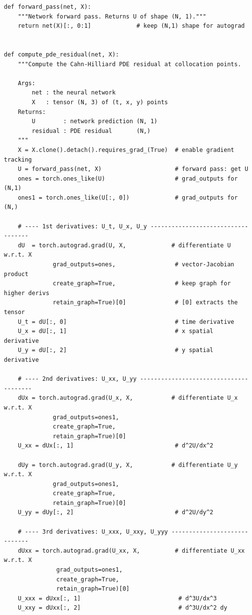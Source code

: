 \documentclass[11pt,a4paper]{article}
\begin{document}
\begin{lstlisting}
def forward_pass(net, X):
    """Network forward pass. Returns U of shape (N, 1)."""
    return net(X)[:, 0:1]             # keep (N,1) shape for autograd


def compute_pde_residual(net, X):
    """Compute the Cahn-Hilliard PDE residual at collocation points.

    Args:
        net : the neural network
        X   : tensor (N, 3) of (t, x, y) points
    Returns:
        U        : network prediction (N, 1)
        residual : PDE residual       (N,)
    """
    X = X.clone().detach().requires_grad_(True)  # enable gradient tracking
    U = forward_pass(net, X)                     # forward pass: get U
    ones = torch.ones_like(U)                    # grad_outputs for (N,1)
    ones1 = torch.ones_like(U[:, 0])             # grad_outputs for (N,)

    # ---- 1st derivatives: U_t, U_x, U_y -----------------------------------
    dU  = torch.autograd.grad(U, X,             # differentiate U w.r.t. X
              grad_outputs=ones,                 # vector-Jacobian product
              create_graph=True,                 # keep graph for higher derivs
              retain_graph=True)[0]              # [0] extracts the tensor
    U_t = dU[:, 0]                               # time derivative
    U_x = dU[:, 1]                               # x spatial derivative
    U_y = dU[:, 2]                               # y spatial derivative

    # ---- 2nd derivatives: U_xx, U_yy ---------------------------------------
    dUx = torch.autograd.grad(U_x, X,           # differentiate U_x w.r.t. X
              grad_outputs=ones1,
              create_graph=True,
              retain_graph=True)[0]
    U_xx = dUx[:, 1]                             # d^2U/dx^2

    dUy = torch.autograd.grad(U_y, X,           # differentiate U_y w.r.t. X
              grad_outputs=ones1,
              create_graph=True,
              retain_graph=True)[0]
    U_yy = dUy[:, 2]                             # d^2U/dy^2

    # ---- 3rd derivatives: U_xxx, U_xxy, U_yyy -----------------------------
    dUxx = torch.autograd.grad(U_xx, X,          # differentiate U_xx w.r.t. X
               grad_outputs=ones1,
               create_graph=True,
               retain_graph=True)[0]
    U_xxx = dUxx[:, 1]                            # d^3U/dx^3
    U_xxy = dUxx[:, 2]                            # d^3U/dx^2 dy


\end{lstlisting}
\end{document}
